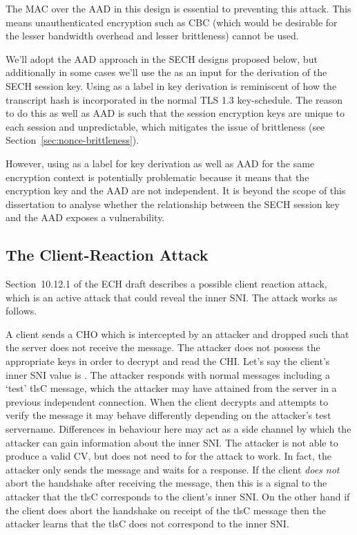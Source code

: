 The \ac{MAC} over the \ac{AAD} in this design is
essential to preventing this attack.
This means unauthenticated encryption
such as \ac{CBC}
(which would be desirable for the lesser bandwidth overhead and lesser \nonce brittleness)
cannot be used.

We'll adopt the \ac{AAD} approach in the \ac{SECH} designs proposed below,
but additionally in some cases we'll use the 
as an input for the derivation of the \ac{SECH} session key.
Using  as a label in key derivation is reminiscent of
how the transcript hash is incorporated in the normal \ac{TLS} 1.3
key-schedule.
The reason to do this as well as \ac{AAD} is such that the
session encryption keys are unique to each session and unpredictable,
which mitigates the issue of \nonce brittleness (see Section~\ref{sec:nonce-brittleness}).

However, using  as a label for key derivation as well as \ac{AAD}
for the same encryption context is potentially problematic because it means
that the encryption key and the \ac{AAD} are not independent.
It is beyond the scope of this dissertation to analyse whether the relationship
between the \ac{SECH} session key and the \ac{AAD} exposes a vulnerability. %

\subsection{The Client-Reaction Attack}

Section~10.12.1 of the \ac{ECH} draft describes a possible client reaction attack, which is
an active attack that could reveal the inner \ac{SNI}. The attack works as follows.

A client sends a \ac{CHO} which is intercepted by an attacker and dropped such that
the server does not receive the message.
The attacker does not possess the appropriate
keys in order to decrypt and read the \ac{CHI}. Let's say
the client's inner \ac{SNI} value is .
The attacker
responds with normal messages including a `test' \ac{tlsC} message,
which the attacker may have attained from the server
in a previous independent connection.
When the client decrypts and attempts to verify the  message
it may behave differently depending on the attacker's test servername.
Differences in behaviour here may act as a side channel by which the attacker can
gain information about the inner \ac{SNI}.
The attacker is not able to produce a valid \ac{CV}, but does not need to for the attack to work.
In fact, the attacker only sends the  message and waits for a response.
If the client {\em does not} abort
the handshake after receiving the  message, then
this is a signal to the attacker that
the \ac{tlsC} corresponds to the client's inner \ac{SNI}.
On the other hand if the client does
abort the handshake on receipt of the \ac{tlsC} message then
the attacker learns that the \ac{tlsC}
does not correspond to the inner \ac{SNI}.

